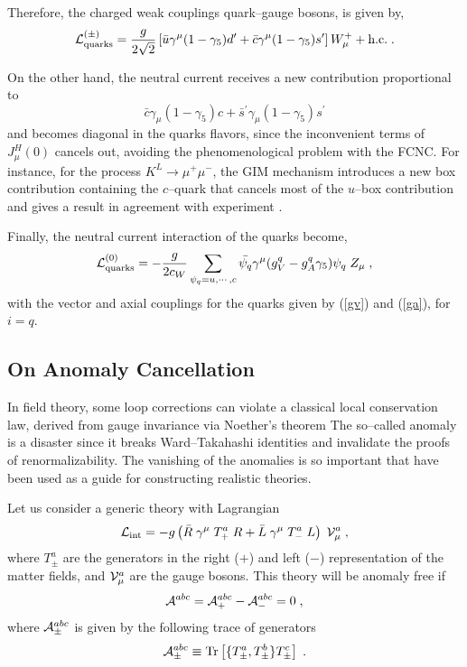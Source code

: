 \documentclass[12pt]{report}
\def\text#1{{\scriptstyle\mathrm{#1}}}
\newcommand{\gc}{\gamma_5}
\newcommand{\g}{\gamma}
\newcommand{\lag}{{\cal L}}
\begin{document}
Therefore, the charged weak couplings quark--gauge bosons, is given
by,
\begin{equation}
\lag_{\text{quarks}}^{(\pm)} = \frac{g}{2\sqrt{2}} 
\left[ \bar{u} \g^\mu (1 - \gc) d^\prime + 
\bar{c} \g^\mu (1 - \gc) s^\prime \right]
W_\mu^+ + \mbox{h.c.} \; .
\label{cha:qua}
\end{equation}

On the other hand, the neutral current receives a new contribution
proportional to  \[ \bar{c} \g_\mu (1 - \gc) c +  \bar{s} {}^\prime
\g_\mu (1 - \gc) s^\prime \] and becomes diagonal in the quarks
flavors, since the inconvenient  terms of $J_\mu^H (0)$ cancels out, 
avoiding the phenomenological problem with the FCNC.  For instance,
for the process $K^L \to \mu^+ \mu^-$, the GIM mechanism introduces a
new box contribution containing the $c$--quark that cancels most of
the $u$--box contribution and gives a result in agreement with 
experiment \cite{Gaillard:74}.

Finally, the neutral current interaction of the quarks become,
\begin{equation}
\lag_{\text{quarks}}^{(0)}  =  - \frac{g}{2c_W} 
 \sum_{\psi_q = u, \cdots, c} 
\bar{\psi_q} \g^\mu (g_V^q - g_A^q \gc) \psi_q \; Z_\mu \; ,
\label{neu:qua}
\end{equation}
with the vector and axial couplings for the quarks given by (\ref{gv})
and  (\ref{ga}), for $i=q$.





\subsection{On Anomaly Cancellation} \indent

In field theory, some loop corrections can violate a classical local
conservation law, derived from gauge invariance via Noether's theorem
The so--called anomaly is a disaster since it breaks Ward--Takahashi
identities and invalidate the proofs of renormalizability. The
vanishing of the anomalies is so important that have been used as a
guide for constructing realistic theories. 

Let us consider a generic theory with Lagrangian
\[
\lag_{\text{int}} = - g \left( \bar{R} \; \g^\mu \;  T^a_+ \;  R + 
       \bar{L} \; \g^\mu \;  T^a_- \; L \right) \; {\cal V}^a_\mu \; ,
\]
where $T^a_\pm$  are the generators in the right ($+$) and left
($-$)  representation of the matter fields, and   ${\cal V}^a_\mu$
are the gauge bosons. This theory will be anomaly free if 
\[
{\cal A}^{abc} = {\cal A}^{abc}_+ - {\cal A}^{abc}_- = 0 \; ,
\]
where ${\cal A}^{abc}_{\pm}$ is given by the following trace of
generators
\[
{\cal A}^{abc}_{\pm} \equiv 
\mbox{Tr} \left[ \{ T^a_{\pm} , T^b_{\pm}\} T^c_{\pm} \right] \; .
\]
\end{document}
